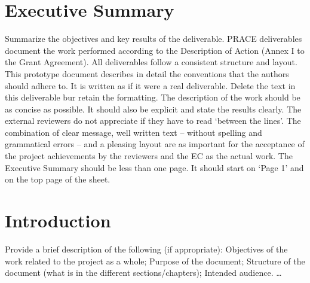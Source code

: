 

\section*{Executive Summary}
Summarize the objectives and key results of the deliverable.
PRACE deliverables document the work performed according to the Description of Action (Annex I to the Grant Agreement). All deliverables follow a consistent structure and layout. This prototype document describes in detail the conventions that the authors should adhere to. It is written as if it were a real deliverable. Delete the text in this deliverable bur retain the formatting.
The description of the work should be as concise as possible. It should also be explicit and state the results clearly. The external reviewers do not appreciate if they have to read ‘between the lines’. The combination of clear message, well written text – without spelling and grammatical errors – and a pleasing layout are as important for the acceptance of the project achievements by the reviewers and the EC as the actual work.
The Executive Summary should be less than one page. It should start on ‘Page 1’ and on the top page of the sheet.


\section{Introduction}
Provide a brief description of the following (if appropriate):
Objectives of the work related to the project as a whole;
Purpose of the document;
Structure of the document (what is in the different sections/chapters);
Intended audience.
…
